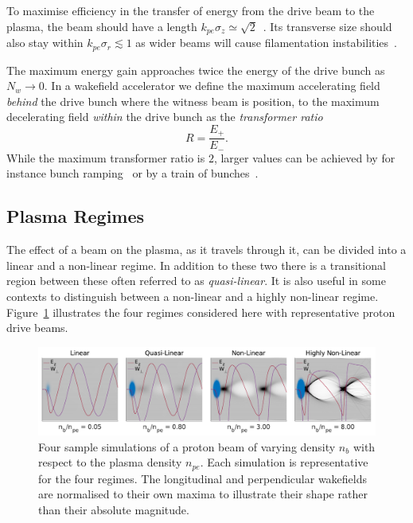 To maximise efficiency in the transfer of energy from the drive beam to the plasma, the beam should have a length $k_{pe}\sigma_{z} \simeq \sqrt{2}$~\cite{lu:2005,lee:2000}.
Its transverse size should also stay within $k_{pe}\sigma_{r} \lesssim 1$ as wider beams will cause filamentation instabilities~\cite{allen:2012,sentoku:2003}.

The maximum energy gain approaches twice the energy of the drive bunch as $N_{w} \to 0$.
In a wakefield accelerator we define the maximum accelerating field \textit{behind} the drive bunch where the witness beam is position, to the maximum decelerating field \textit{within} the drive bunch as the \textit{transformer ratio}~\cite{muggli:2017}
\begin{equation}
    R = \frac{E_{+}}{E_{-}}. \label{EQ:TRat}
\end{equation}
While the maximum transformer ratio is $2$, larger values can be achieved by for instance bunch ramping~\cite{bane:1985} or by a train of bunches~\cite{jing:2006}.

\subsection{Plasma Regimes}
\label{Int:BPI:Reg}

The effect of a beam on the plasma, as it travels through it, can be divided into a linear and a non-linear regime.
In addition to these two there is a transitional region between these often referred to as \textit{quasi-linear}.
It is also useful in some contexts to distinguish between a non-linear and a highly non-linear regime. Figure~\ref{Fig:BPI:Regime} illustrates the four regimes considered here with representative proton drive beams.

\begin{figure}[hbt]
    \centering
    \includegraphics[width=1.0\linewidth]{figures/Regimes}
    \caption{\label{Fig:BPI:Regime}
        Four sample simulations of a proton beam of varying density $n_{b}$ with respect to the plasma density $n_{pe}$.
        Each simulation is representative for the four regimes.
        The longitudinal and perpendicular wakefields are normalised to their own maxima to illustrate their shape rather than their absolute magnitude.
    }
\end{figure}

